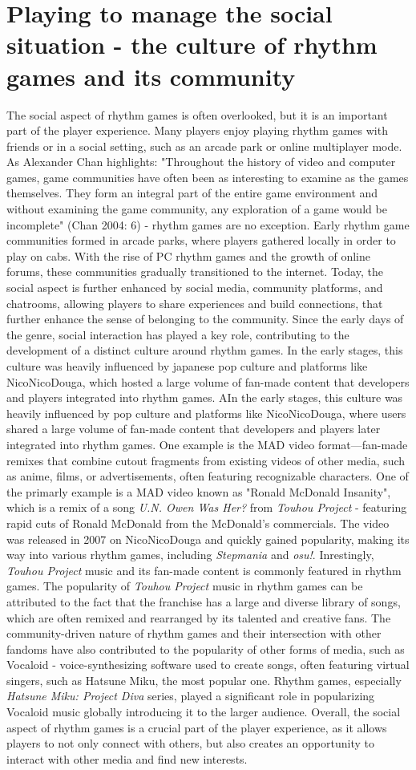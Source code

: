 \section{Playing to manage the social situation - the culture of rhythm games and its community}
The social aspect of rhythm games is often overlooked, but it is an important part of the player experience. Many players enjoy playing rhythm games with friends or in a social setting, such as an arcade park or online multiplayer mode. As Alexander Chan highlights: "Throughout the history of video and computer games, game communities have often been as interesting to examine as the games themselves. They form an integral part of the entire game environment and without examining the game community, any exploration of a game would be incomplete" (Chan 2004: 6) \cite{arcadeculture} - rhythm games are no exception. Early rhythm game communities formed in arcade parks, where players gathered locally in order to play on cabs. With the rise of PC rhythm games and the growth of online forums, these communities gradually transitioned to the internet. Today, the social aspect is further enhanced by social media, community platforms, and chatrooms, allowing players to share experiences and build connections, that further enhance the sense of belonging to the community. Since the early days of the genre, social interaction has played a key role, contributing to the development of a distinct culture around rhythm games. In the early stages, this culture was heavily influenced by japanese pop culture and platforms like NicoNicoDouga, which hosted a large volume of fan-made content that developers and players integrated into rhythm games. AIn the early stages, this culture was heavily influenced by pop culture and platforms like NicoNicoDouga, where users shared a large volume of fan-made content that developers and players later integrated into rhythm games. One example is the MAD video format—fan-made remixes that combine cutout fragments from existing videos of other media, such as anime, films, or advertisements, often featuring recognizable characters. One of the primarly example is a MAD video known as "Ronald McDonald Insanity", which is a remix of a song \textit{U.N. Owen Was Her?} from \textit{Touhou Project} - featuring rapid cuts of Ronald McDonald from the McDonald's commercials. The video was released in 2007 on NicoNicoDouga and quickly gained popularity, making its way into various rhythm games, including \textit{Stepmania} and \textit{osu!}. Inrestingly, \textit{Touhou Project} music and its fan-made content is commonly featured in rhythm games. The popularity of \textit{Touhou Project} music in rhythm games can be attributed to the fact that the franchise has a large and diverse library of songs, which are often remixed and rearranged by its talented and creative fans. The community-driven nature of rhythm games and their intersection with other fandoms have also contributed to the popularity of other forms of media, such as Vocaloid - voice-synthesizing software used to create songs, often featuring virtual singers, such as Hatsune Miku, the most popular one. Rhythm games, especially \textit{Hatsune Miku: Project Diva} series, played a significant role in popularizing Vocaloid music globally introducing it to the larger audience. Overall, the social aspect of rhythm games is a crucial part of the player experience, as it allows players to not only connect with others, but also creates an opportunity to interact with other media and find new interests.